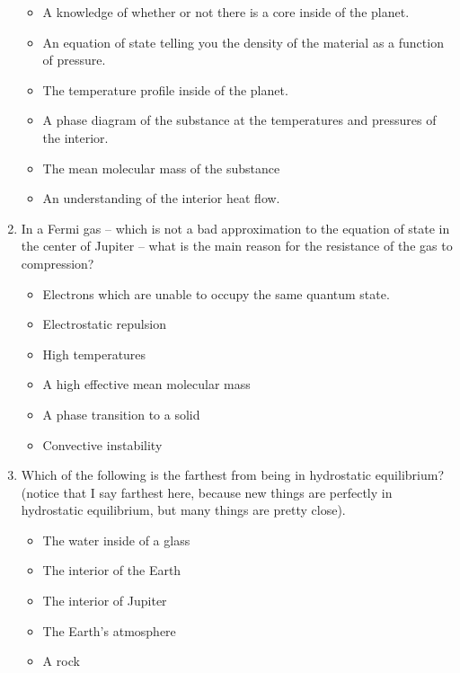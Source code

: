 \begin{enumerate}
    \begin{itemize}[label={$\bullet$}]
        \item A knowledge of whether or not there is a core inside of the planet.
        \item An equation of state telling you the density of the material as a function of pressure.
        \item The temperature profile inside of the planet.
        \item A phase diagram of the substance at the temperatures and pressures of the interior.
        \item The mean molecular mass of the substance
        \item An understanding of the interior heat flow.
    \end{itemize}
    

    \item[4.] In a Fermi gas -- which is not a bad approximation to the equation of state in the center of Jupiter -- what is the main reason for the resistance of the gas to compression?
    \begin{multicols}{4}
    \begin{itemize}[label={$\bullet$}]
        \item Electrons which are unable to occupy the same quantum state.
        \item Electrostatic repulsion
        \item High temperatures
        \item A high effective mean molecular mass
        \item A phase transition to a solid
        \item Convective instability
    \end{itemize}
\end{multicols}

    \item[5.] Which of the following is the farthest from being in hydrostatic equilibrium? (notice that I say farthest here, because new things are perfectly in hydrostatic equilibrium, but many things are pretty close).
    
    \begin{itemize}[label={$\bullet$}]
        \item The water inside of a glass
        \item The interior of the Earth
        \item The interior of Jupiter
        \item The Earth's atmosphere
        \item A rock
    \end{itemize}


\end{enumerate}
